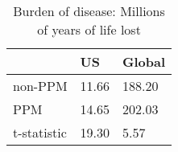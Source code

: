 \begin{table}[htbp]
\caption{\label{clabel} Burden of disease: Millions of years of life lost}\centering\medskip
\begin{tabular}{|l|l|l|}\hline  
 & US  & Global  \\ \hline  
non-PPM &     11.66 &    188.20 \\ \hline 
PPM &     14.65 &    202.03 \\ \hline 
t-statistic &     19.30 &      5.57 \\ \hline 
  \end{tabular}
\end{table}
